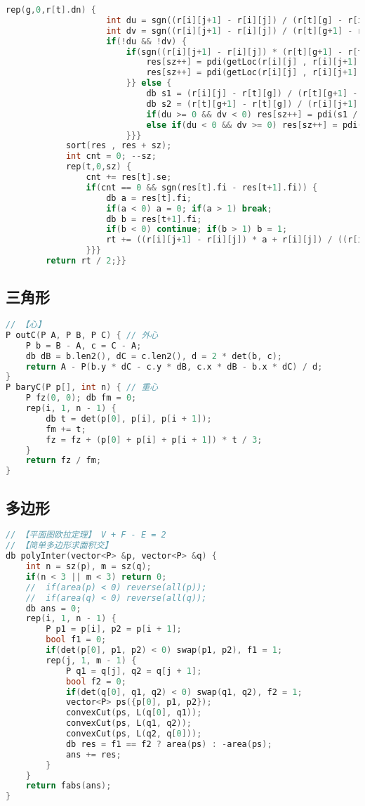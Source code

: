 \begin{lstlisting}[language=C++]
				rep(g,0,r[t].dn) {
					int du = sgn((r[i][j+1] - r[i][j]) / (r[t][g] - r[i][j]));
					int dv = sgn((r[i][j+1] - r[i][j]) / (r[t][g+1] - r[i][j]));
					if(!du && !dv) {
						if(sgn((r[i][j+1] - r[i][j]) * (r[t][g+1] - r[t][g])) < 0 || i < t){
							res[sz++] = pdi(getLoc(r[i][j] , r[i][j+1] , r[t][g]) , 1);
							res[sz++] = pdi(getLoc(r[i][j] , r[i][j+1] , r[t][g+1]) , -1);
						}} else {
							db s1 = (r[i][j] - r[t][g]) / (r[t][g+1] - r[t][g]);
							db s2 = (r[t][g+1] - r[t][g]) / (r[i][j+1] - r[t][g]);
							if(du >= 0 && dv < 0) res[sz++] = pdi(s1 / (s1 + s2) , 1);
							else if(du < 0 && dv >= 0) res[sz++] = pdi(s1 / (s1 + s2) , -1);
						}}}
			sort(res , res + sz);
			int cnt = 0; --sz;
			rep(t,0,sz) {
				cnt += res[t].se;
				if(cnt == 0 && sgn(res[t].fi - res[t+1].fi)) {
					db a = res[t].fi;
					if(a < 0) a = 0; if(a > 1) break;
					db b = res[t+1].fi;
					if(b < 0) continue; if(b > 1) b = 1;
					rt += ((r[i][j+1] - r[i][j]) * a + r[i][j]) / ((r[i][j+1]-r[i][j]) * b + r[i][j]);
				}}}
		return rt / 2;}}
\end{lstlisting}
\subsection{三角形}
\begin{lstlisting}[language=C++]
// 【心】
P outC(P A, P B, P C) { // 外心
	P b = B - A, c = C - A;
	db dB = b.len2(), dC = c.len2(), d = 2 * det(b, c);
	return A - P(b.y * dC - c.y * dB, c.x * dB - b.x * dC) / d;
}
P baryC(P p[], int n) { // 重心
	P fz(0, 0); db fm = 0;
	rep(i, 1, n - 1) {
		db t = det(p[0], p[i], p[i + 1]);
		fm += t;
		fz = fz + (p[0] + p[i] + p[i + 1]) * t / 3;
	}
	return fz / fm;
}
\end{lstlisting}
\subsection{多边形}
\begin{lstlisting}[language=C++]
// 【平面图欧拉定理】 V + F - E = 2
// 【简单多边形求面积交】
db polyInter(vector<P> &p, vector<P> &q) {
	int n = sz(p), m = sz(q);
	if(n < 3 || m < 3) return 0;
	//	if(area(p) < 0) reverse(all(p));
	//	if(area(q) < 0) reverse(all(q));
	db ans = 0;
	rep(i, 1, n - 1) {
		P p1 = p[i], p2 = p[i + 1];
		bool f1 = 0;
		if(det(p[0], p1, p2) < 0) swap(p1, p2), f1 = 1;
		rep(j, 1, m - 1) {
			P q1 = q[j], q2 = q[j + 1];
			bool f2 = 0;
			if(det(q[0], q1, q2) < 0) swap(q1, q2), f2 = 1;
			vector<P> ps({p[0], p1, p2});
			convexCut(ps, L(q[0], q1));
			convexCut(ps, L(q1, q2));
			convexCut(ps, L(q2, q[0]));
			db res = f1 == f2 ? area(ps) : -area(ps);
			ans += res;
		}
	}
	return fabs(ans);
}
\end{lstlisting}
